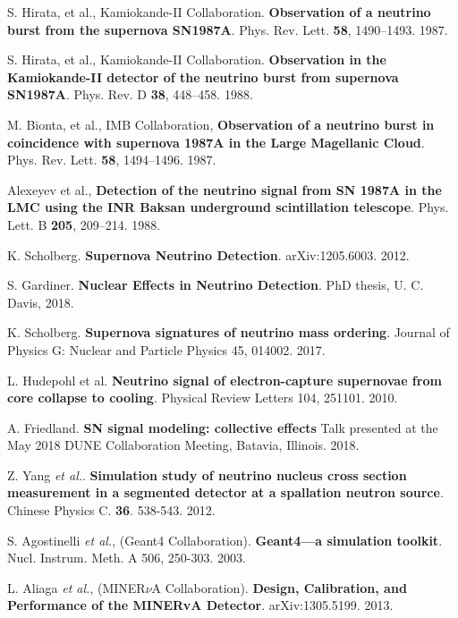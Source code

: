 S. Hirata, et al., Kamiokande-II Collaboration. \textbf{Observation of a neutrino burst from the supernova SN1987A}. Phys. Rev. Lett. \textbf{58}, 1490–1493. 1987.

 S. Hirata, et al., Kamiokande-II Collaboration. \textbf{Observation in the Kamiokande-II detector of the neutrino burst from supernova SN1987A}. Phys. Rev. D \textbf{38}, 448–458. 1988.

 M. Bionta, et al., IMB Collaboration, \textbf{Observation of a neutrino burst in coincidence with supernova 1987A in the Large Magellanic Cloud}. Phys. Rev. Lett. \textbf{58}, 1494–1496. 1987. 

 Alexeyev et al., \textbf{Detection of the neutrino signal from SN 1987A in the LMC using the INR Baksan underground scintillation telescope}. Phys. Lett. B \textbf{205}, 209–214. 1988.

 K. Scholberg. \textbf{Supernova Neutrino Detection}. arXiv:1205.6003. 2012.

 S. Gardiner. \textbf{Nuclear Effects in Neutrino Detection}. PhD thesis,  U. C. Davis, 2018.

 K. Scholberg. \textbf{Supernova signatures of neutrino mass ordering}. Journal of Physics G: Nuclear and Particle Physics 45, 014002. 2017.

 L. Hudepohl et al. \textbf{Neutrino signal of electron-capture supernovae from core collapse to cooling}. Physical Review Letters 104, 251101. 2010.

 A. Friedland. \textbf{SN signal modeling: collective effects} Talk presented at the May 2018 DUNE Collaboration Meeting, Batavia, Illinois. 2018. 

 Z. Yang \textit{et al.}. \textbf{Simulation study of neutrino nucleus cross section measurement in a segmented detector at a spallation neutron source}. Chinese Physics C. \textbf{36}. 538-543. 2012. 


 S. Agostinelli \textit{et al.}, (Geant4 Collaboration). \textbf{Geant4—a simulation toolkit}. Nucl. Instrum. Meth. A 506, 250-303. 2003.

 L. Aliaga \textit{et al.}, (MINER$\nu$A Collaboration). \textbf{Design, Calibration, and Performance of the MINERvA Detector}.  arXiv:1305.5199. 2013. 

